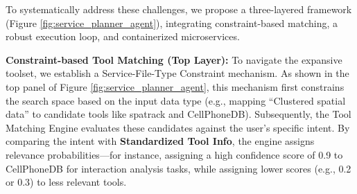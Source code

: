 \documentclass[11pt,a4paper]{article}
\begin{document}




To systematically address these challenges, we propose a three-layered framework (Figure \ref{fig:service_planner_agent}), integrating constraint-based matching, a robust execution loop, and containerized microservices.

\textbf{Constraint-based Tool Matching (Top Layer):} To navigate the expansive toolset, we establish a Service-File-Type Constraint mechanism. As shown in the top panel of Figure \ref{fig:service_planner_agent}, this mechanism first constrains the search space based on the input data type (e.g., mapping ``Clustered spatial data'' to candidate tools like spatrack and CellPhoneDB). Subsequently, the Tool Matching Engine evaluates these candidates against the user's specific intent. By comparing the intent with \textbf{Standardized Tool Info}, the engine assigns relevance probabilities—for instance, assigning a high confidence score of 0.9 to CellPhoneDB for interaction analysis tasks, while assigning lower scores (e.g., 0.2 or 0.3) to less relevant tools.
\end{document}
